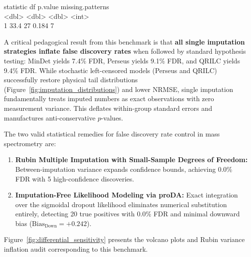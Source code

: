 \documentclass[11pt,oneside]{book}
\begin{document}
\begin{routput}
\hspace*{1em}statistic \hspace*{1.5em}df p.value missing.patterns\\
\hspace*{1em}\textless{}dbl\textgreater{} \hspace*{2em}\textless{}dbl\textgreater{} \hspace*{1em}\textless{}dbl\textgreater{} \hspace*{3em}\textless{}int\textgreater{}\\
1 \hspace*{1.2em}33.4 \hspace*{2.5em}27 \hspace*{0.8em}0.184 \hspace*{4em}7
\end{routput}

A critical pedagogical result from this benchmark is that \textbf{all single imputation strategies inflate false discovery rates} when followed by standard hypothesis testing: MinDet yields 7.4\% FDR, Perseus yields 9.1\% FDR, and QRILC yields 9.4\% FDR. While stochastic left-censored models (Perseus and QRILC) successfully restore physical tail distributions (Figure~\ref{fig:imputation_distributions}) and lower NRMSE, single imputation fundamentally treats imputed numbers as exact observations with zero measurement variance. This deflates within-group standard errors and manufactures anti-conservative $p$-values.

The two valid statistical remedies for false discovery rate control in mass spectrometry are:
\begin{enumerate}
    \item \textbf{Rubin Multiple Imputation with Small-Sample Degrees of Freedom:} Between-imputation variance expands confidence bounds, achieving 0.0\% FDR with 5 high-confidence discoveries.
    \item \textbf{Imputation-Free Likelihood Modeling via proDA:} Exact integration over the sigmoidal dropout likelihood eliminates numerical substitution entirely, detecting 20 true positives with 0.0\% FDR and minimal downward bias ($\text{Bias}_{\text{Down}} = +0.242$).
\end{enumerate}

Figure~\ref{fig:differential_sensitivity} presents the volcano plots and Rubin variance inflation audit corresponding to this benchmark.
\end{document}
